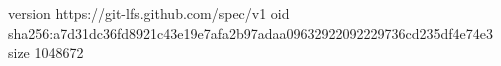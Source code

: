 version https://git-lfs.github.com/spec/v1
oid sha256:a7d31dc36fd8921c43e19e7afa2b97adaa09632922092229736cd235df4e74e3
size 1048672
